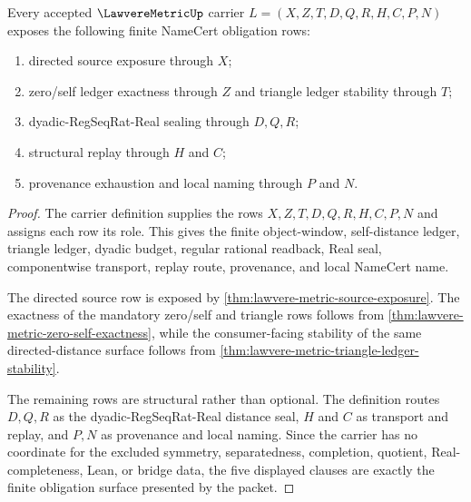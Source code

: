 \begin{theorem}
\label{thm:lawvere-metric-namecert-obligation-surface}
Every accepted $\LawvereMetricUp$ carrier $L=(X,Z,T,D,Q,R,H,C,P,N)$ exposes the following finite NameCert obligation rows:
\begin{enumerate}
\item directed source exposure through $X$;
\item zero/self ledger exactness through $Z$ and triangle ledger stability through $T$;
\item dyadic-RegSeqRat-Real sealing through $D,Q,R$;
\item structural replay through $H$ and $C$;
\item provenance exhaustion and local naming through $P$ and $N$.
\end{enumerate}
\end{theorem}
\begin{proof}
The carrier definition supplies the rows $X,Z,T,D,Q,R,H,C,P,N$ and assigns each row its role. This gives the finite object-window, self-distance ledger, triangle ledger, dyadic budget, regular rational readback, Real seal, componentwise transport, replay route, provenance, and local NameCert name.

The directed source row is exposed by \autoref{thm:lawvere-metric-source-exposure}. The exactness of the mandatory zero/self and triangle rows follows from \autoref{thm:lawvere-metric-zero-self-exactness}, while the consumer-facing stability of the same directed-distance surface follows from \autoref{thm:lawvere-metric-triangle-ledger-stability}.

The remaining rows are structural rather than optional. The definition routes $D,Q,R$ as the dyadic-RegSeqRat-Real distance seal, $H$ and $C$ as transport and replay, and $P,N$ as provenance and local naming. Since the carrier has no coordinate for the excluded symmetry, separatedness, completion, quotient, Real-completeness, Lean, or bridge data, the five displayed clauses are exactly the finite obligation surface presented by the packet.
\end{proof}


